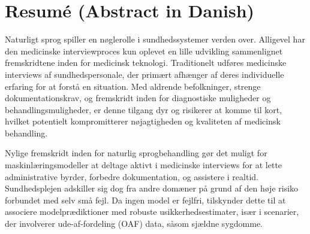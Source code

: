 
\chapter[resumé (abstract in danish)]{Resumé (Abstract in Danish)}

Naturligt sprog spiller en nøglerolle i sundhedssystemer verden over. Alligevel har den medicinske interviewproces kun oplevet en lille udvikling sammenlignet fremskridtene inden for medicinsk teknologi.
Traditionelt udføres medicinske interviews af sundhedspersonale, der primært afhænger af deres individuelle erfaring for at forstå en situation.
Med aldrende befolkninger, strenge dokumentationskrav, og fremskridt inden for diagnostiske muligheder og behandlingsmuligheder, er denne tilgang dyr og risikerer at komme til kort, hvilket potentielt kompromitterer nøjagtigheden og kvaliteten af medicinsk behandling.

Nylige fremskridt inden for naturlig sprogbehandling gør det muligt for maskinlæringsmodeller at deltage aktivt i medicinske interviews for at lette administrative byrder, forbedre dokumentation, og assistere i realtid.
Sundhedsplejen adskiller sig dog fra andre domæner på grund af den høje risiko forbundet med selv små fejl. Da ingen model er fejlfri, tilskynder dette til at associere modelprædiktioner med robuste usikkerhedsestimater, især i scenarier, der involverer ude-af-fordeling (OAF) data, såsom sjældne sygdomme.

